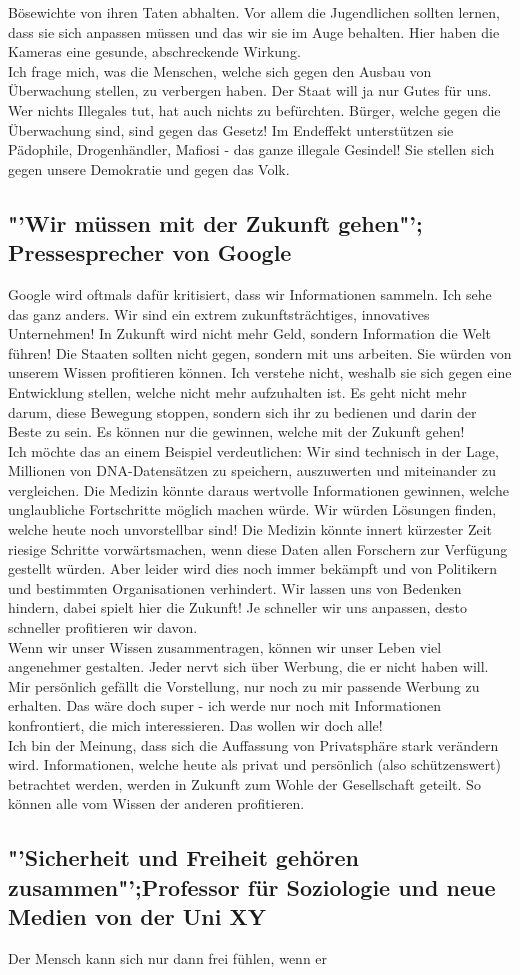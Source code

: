 Bösewichte von ihren Taten abhalten. Vor allem die Jugendlichen sollten lernen, dass sie sich anpassen müssen und das wir sie im Auge behalten. Hier haben die Kameras eine gesunde, abschreckende Wirkung.\\Ich frage mich, was die Menschen, welche sich gegen den Ausbau von Überwachung stellen, zu verbergen haben. Der Staat will ja nur Gutes für uns. Wer nichts Illegales tut, hat auch nichts zu befürchten. Bürger, welche gegen die Überwachung sind, sind gegen das Gesetz! Im Endeffekt unterstützen sie Pädophile, Drogenhändler, Mafiosi - das ganze illegale Gesindel! Sie stellen sich gegen unsere Demokratie und gegen das Volk.\subsection*{"'Wir müssen mit der Zukunft gehen"'; Pressesprecher von Google}Google wird oftmals dafür kritisiert, dass wir Informationen sammeln. Ich sehe das ganz anders. Wir sind ein extrem zukunftsträchtiges, innovatives Unternehmen! In Zukunft wird nicht mehr Geld, sondern Information die Welt führen! Die Staaten sollten nicht gegen, sondern mit uns arbeiten. Sie würden von unserem Wissen profitieren können. Ich verstehe nicht, weshalb sie sich gegen eine Entwicklung stellen, welche nicht mehr aufzuhalten ist. Es geht nicht mehr darum, diese Bewegung stoppen, sondern sich ihr zu bedienen und darin der Beste zu sein. Es können nur die gewinnen, welche mit der Zukunft gehen!\\Ich möchte das an einem Beispiel verdeutlichen: Wir sind technisch in der Lage, Millionen von DNA-Datensätzen zu speichern, auszuwerten und miteinander zu vergleichen. Die Medizin könnte daraus wertvolle Informationen gewinnen, welche unglaubliche Fortschritte möglich machen würde. Wir würden Lösungen finden, welche heute noch unvorstellbar sind! Die Medizin könnte innert kürzester Zeit riesige Schritte vorwärtsmachen, wenn diese Daten allen Forschern zur Verfügung gestellt würden. Aber leider wird dies noch immer bekämpft und von Politikern und bestimmten Organisationen verhindert. Wir lassen uns von Bedenken hindern, dabei spielt hier die Zukunft! Je schneller wir uns anpassen, desto schneller profitieren wir davon.\\Wenn wir unser Wissen zusammentragen, können wir unser Leben viel angenehmer gestalten. Jeder nervt sich über Werbung, die er nicht haben will. Mir persönlich gefällt die Vorstellung, nur noch zu mir passende Werbung zu erhalten. Das wäre doch super - ich werde nur noch mit Informationen konfrontiert, die mich interessieren. Das wollen wir doch alle!\\Ich bin der Meinung, dass sich die Auffassung von Privatsphäre stark verändern wird. Informationen, welche heute als privat und persönlich (also schützenswert) betrachtet werden, werden in Zukunft zum Wohle der Gesellschaft geteilt. So können alle vom Wissen der anderen profitieren.\subsection*{"'Sicherheit und Freiheit gehören zusammen"';Professor für Soziologie und neue Medien von der Uni XY}Der Mensch kann sich nur dann frei fühlen, wenn er 